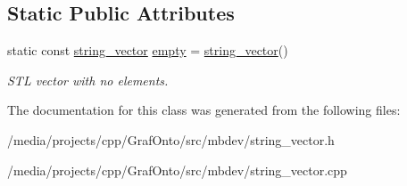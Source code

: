 \subsection*{\-Static \-Public \-Attributes}
\begin{DoxyCompactItemize}
\item 
\hypertarget{classmbdev_1_1string__vector_a217dba7ae43824ecc9da76db562fed16}{static const \hyperlink{classmbdev_1_1string__vector}{string\-\_\-vector} \hyperlink{classmbdev_1_1string__vector_a217dba7ae43824ecc9da76db562fed16}{empty} = \hyperlink{classmbdev_1_1string__vector}{string\-\_\-vector}()}\label{classmbdev_1_1string__vector_a217dba7ae43824ecc9da76db562fed16}

\begin{DoxyCompactList}\small\item\em \-S\-T\-L vector with no elements. \end{DoxyCompactList}\end{DoxyCompactItemize}


\-The documentation for this class was generated from the following files\-:\begin{DoxyCompactItemize}
\item 
/media/projects/cpp/\-Graf\-Onto/src/mbdev/string\-\_\-vector.\-h\item 
/media/projects/cpp/\-Graf\-Onto/src/mbdev/string\-\_\-vector.\-cpp\end{DoxyCompactItemize}
